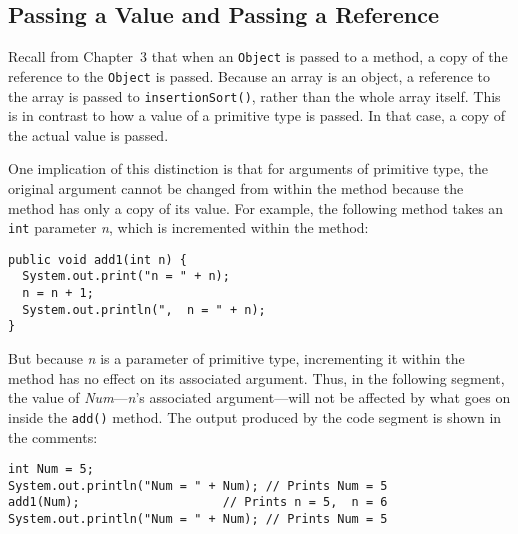 \subsection{Passing a Value and Passing a Reference}
\noindent Recall from Chapter~3 that when an {\tt Object} is
passed to a method, a copy of the reference to the {\tt Object} is
passed.  Because an array is an object, a reference to the array is
passed to {\tt insertionSort()}, rather than the whole array itself.
This is in contrast to how a value of a primitive type is passed.  In
that case, a copy of the actual value is passed.

\pagebreak
{}

\noindent One implication of this distinction is that for arguments of
primitive type, the original argument cannot be changed from within
the method because the method has only a copy of its value.  For
example, the following method takes an {\tt int} parameter {\it
n}, which is incremented within the method:

\begin{jjjlisting}
\begin{lstlisting}
public void add1(int n) {
  System.out.print("n = " + n);
  n = n + 1;
  System.out.println(",  n = " + n);
}
\end{lstlisting}
\end{jjjlisting}

\noindent But because {\it n} is a parameter of primitive type, incrementing
it within the method has no effect on its associated argument.  Thus,
in the following segment, the value of {\it Num}---{\it n}'s associated
argument---will not be affected by what goes on inside the {\tt add()}
method.  The output produced by the code segment is shown in the comments:

\begin{jjjlisting}
\begin{lstlisting}
int Num = 5;
System.out.println("Num = " + Num); // Prints Num = 5
add1(Num);                    // Prints n = 5,  n = 6            
System.out.println("Num = " + Num); // Prints Num = 5
\end{lstlisting}
\end{jjjlisting}

